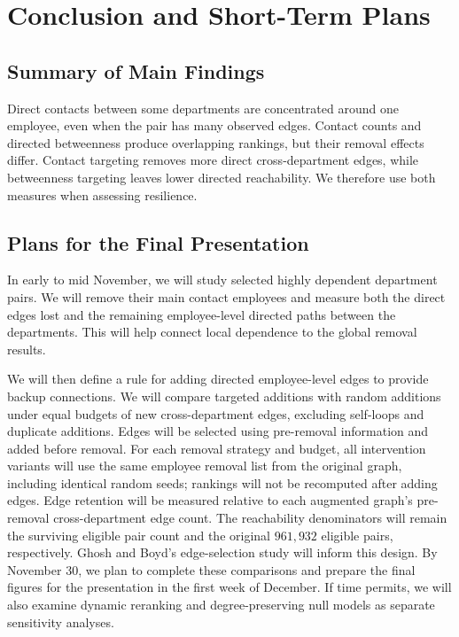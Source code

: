 \documentclass[conference]{IEEEtran}
\begin{document}
\section{Conclusion and Short-Term Plans}

\subsection{Summary of Main Findings}
Direct contacts between some departments are concentrated around one employee, even when the pair has many observed edges. Contact counts and directed betweenness produce overlapping rankings, but their removal effects differ. Contact targeting removes more direct cross-department edges, while betweenness targeting leaves lower directed reachability. We therefore use both measures when assessing resilience.

\subsection{Plans for the Final Presentation}
In early to mid November, we will study selected highly dependent department pairs. We will remove their main contact employees and measure both the direct edges lost and the remaining employee-level directed paths between the departments. This will help connect local dependence to the global removal results.

We will then define a rule for adding directed employee-level edges to provide backup connections. We will compare targeted additions with random additions under equal budgets of new cross-department edges, excluding self-loops and duplicate additions. Edges will be selected using pre-removal information and added before removal. For each removal strategy and budget, all intervention variants will use the same employee removal list from the original graph, including identical random seeds; rankings will not be recomputed after adding edges. Edge retention will be measured relative to each augmented graph's pre-removal cross-department edge count. The reachability denominators will remain the surviving eligible pair count and the original $961,932$ eligible pairs, respectively. Ghosh and Boyd's edge-selection study \cite{ghosh2006growing} will inform this design. By November 30, we plan to complete these comparisons and prepare the final figures for the presentation in the first week of December. If time permits, we will also examine dynamic reranking and degree-preserving null models as separate sensitivity analyses.
\end{document}
